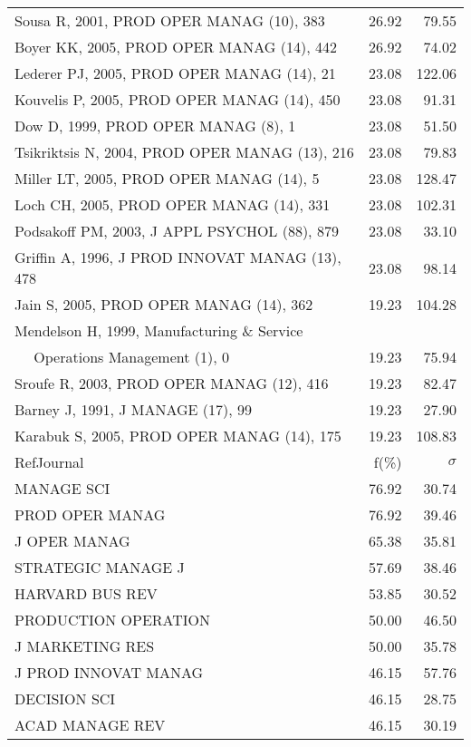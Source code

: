 \documentclass[a4paper,11pt]{report}
\begin{document}
\begin{landscape}
\begin{table}[!ht]
{\begin{tabular}{|l r r|}
Sousa R, 2001, PROD OPER MANAG (10), 383 & 26.92 & 79.55\\
Boyer KK, 2005, PROD OPER MANAG (14), 442 & 26.92 & 74.02\\
Lederer PJ, 2005, PROD OPER MANAG (14), 21 & 23.08 & 122.06\\
Kouvelis P, 2005, PROD OPER MANAG (14), 450 & 23.08 & 91.31\\
Dow D, 1999, PROD OPER MANAG (8), 1 & 23.08 & 51.50\\
Tsikriktsis N, 2004, PROD OPER MANAG (13), 216 & 23.08 & 79.83\\
Miller LT, 2005, PROD OPER MANAG (14), 5 & 23.08 & 128.47\\
Loch CH, 2005, PROD OPER MANAG (14), 331 & 23.08 & 102.31\\
Podsakoff PM, 2003, J APPL PSYCHOL (88), 879 & 23.08 & 33.10\\
Griffin A, 1996, J PROD INNOVAT MANAG (13), 478 & 23.08 & 98.14\\
Jain S, 2005, PROD OPER MANAG (14), 362 & 19.23 & 104.28\\
Mendelson H, 1999, Manufacturing \& Service &  & \\
$\quad$ Operations Management (1), 0 & 19.23 & 75.94\\
Sroufe R, 2003, PROD OPER MANAG (12), 416 & 19.23 & 82.47\\
Barney J, 1991, J MANAGE (17), 99 & 19.23 & 27.90\\
Karabuk S, 2005, PROD OPER MANAG (14), 175 & 19.23 & 108.83\\
\hline
\hline
RefJournal & f(\%) & $\sigma$\\
\hline
MANAGE SCI & 76.92 & 30.74\\
PROD OPER MANAG & 76.92 & 39.46\\
J OPER MANAG & 65.38 & 35.81\\
STRATEGIC MANAGE J & 57.69 & 38.46\\
HARVARD BUS REV & 53.85 & 30.52\\
PRODUCTION OPERATION & 50.00 & 46.50\\
J MARKETING RES & 50.00 & 35.78\\
J PROD INNOVAT MANAG & 46.15 & 57.76\\
DECISION SCI & 46.15 & 28.75\\
ACAD MANAGE REV & 46.15 & 30.19\\
\hline
\end{tabular}
}
\end{table}

\end{landscape}
\end{document}
